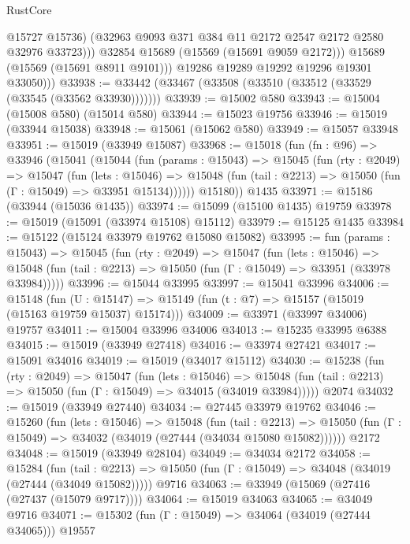 \begin{lexlean}{RustCore}
\begin{coremodule}
                    @15727
                    @15736)
                  (@32963 @9093 @371 @384 @11 @2172 @2547 @2172 @2580 @32976 @33723)))
              @32854
              @15689
              (@15569 (@15691 @9059 @2172)))
            @15689
            (@15569 (@15691 @8911 @9101)))
          @19286
          @19289
          @19292
          @19296
          @19301
          @33050)))
@33938 := @33442 (@33467 (@33508 (@33510 (@33512 (@33529 (@33545 (@33562 @33930)))))))
@33939 := @15002 @580
@33943 := @15004 (@15008 @580) (@15014 @580)
@33944 := @15023 @19756
@33946 := @15019 (@33944 @15038)
@33948 := @15061 (@15062 @580)
@33949 := @15057 @33948
@33951 := @15019 (@33949 @15087)
@33968 := @15018
    (fun (fn : @96) =>
    @33946
      (@15041
        (@15044
          (fun (params : @15043) =>
          @15045
            (fun (rty : @2049) =>
            @15047
              (fun (lets : @15046) =>
              @15048 (fun (tail : @2213) => @15050 (fun (Γ : @15049) => @33951 @15134))))))
        @15180))
    @1435
@33971 := @15186 (@33944 (@15036 @1435))
@33974 := @15099 (@15100 @1435) @19759
@33978 := @15019 (@15091 (@33974 @15108) @15112)
@33979 := @15125 @1435
@33984 := @15122 (@15124 @33979 @19762 @15080 @15082)
@33995 := fun (params : @15043) =>
  @15045
    (fun (rty : @2049) =>
    @15047
      (fun (lets : @15046) =>
      @15048 (fun (tail : @2213) => @15050 (fun (Γ : @15049) => @33951 (@33978 @33984)))))
@33996 := @15044 @33995
@33997 := @15041 @33996
@34006 := @15148
    (fun (U : @15147) => @15149 (fun (t : @7) => @15157 (@15019 (@15163 @19759 @15037) @15174)))
@34009 := @33971 (@33997 @34006) @19757
@34011 := @15004 @33996 @34006
@34013 := @15235 @33995 @6388
@34015 := @15019 (@33949 @27418)
@34016 := @33974 @27421
@34017 := @15091 @34016
@34019 := @15019 (@34017 @15112)
@34030 := @15238
    (fun (rty : @2049) =>
    @15047
      (fun (lets : @15046) =>
      @15048 (fun (tail : @2213) => @15050 (fun (Γ : @15049) => @34015 (@34019 @33984)))))
    @2074
@34032 := @15019 (@33949 @27440)
@34034 := @27445 @33979 @19762
@34046 := @15260
    (fun (lets : @15046) =>
    @15048
      (fun (tail : @2213) =>
      @15050 (fun (Γ : @15049) => @34032 (@34019 (@27444 (@34034 @15080 @15082))))))
    @2172
@34048 := @15019 (@33949 @28104)
@34049 := @34034 @2172
@34058 := @15284
    (fun (tail : @2213) => @15050 (fun (Γ : @15049) => @34048 (@34019 (@27444 (@34049 @15082)))))
    @9716
@34063 := @33949 (@15069 (@27416 (@27437 (@15079 @9717))))
@34064 := @15019 @34063
@34065 := @34049 @9716
@34071 := @15302 (fun (Γ : @15049) => @34064 (@34019 (@27444 @34065))) @19557

\end{coremodule}
\end{lexlean}
